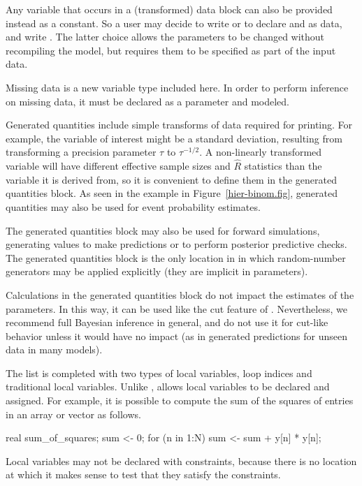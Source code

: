 \documentclass[article]{jss}
\begin{document}
Any variable that occurs in a (transformed) data block can also be
provided instead as a constant.  So a user may decide to write  or to declare  and  as data, and
write .  The latter choice allows the
parameters to be changed without recompiling the model, but requires
them to be specified as part of the input data.

Missing data is a new variable type included here.  In order to
perform inference on missing data, it must be declared as a parameter
and modeled.  

Generated quantities include simple transforms of data required for
printing.  For example, the variable of interest might be a standard
deviation, resulting from transforming a precision parameter $\tau$ to
$\tau^{-1/2}$.  A non-linearly transformed variable will have
different effective sample sizes and $\hat{R}$ statistics than the
variable it is derived from, so it is convenient to define them in the
generated quantities block.  As seen in the example in
Figure~\ref{hier-binom.fig}, generated quantities may also be used for
event probability estimates.  

The generated quantities block may also be used for forward
simulations, generating values to make predictions or to perform
posterior predictive checks.  The generated quantities block is the
only location in  in which random-number generators may
be applied explicitly (they are implicit in parameters).

Calculations in the generated quantities block do not impact the
estimates of the parameters.  In this way, it can be used like the cut
feature of .  Nevertheless, we recommend full Bayesian
inference in general, and do not use it for cut-like behavior unless
it would have no impact (as in generated predictions for unseen data
in many models).

The list is completed with two types of local variables, loop indices
and traditional local variables.  Unlike ,
 allows local variables to be declared and assigned.
For example, it is possible to compute the sum of the squares of
entries in an array or vector  as follows.
%
\begin{Code}
{ 
  real sum_of_squares;
  sum <- 0;
  for (n in 1:N)
    sum <- sum + y[n] * y[n];
}  
\end{Code}
%
Local variables may not be declared with constraints, because there is
no location at which it makes sense to test that they satisfy the
constraints. 
\end{document}

